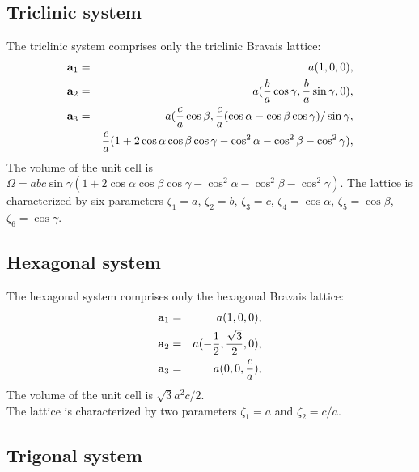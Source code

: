 \documentclass[12pt,a4paper,twoside]{report}
\begin{document}
{\color{web-blue}\subsection{Triclinic system}}
\color{black}

The triclinic system comprises only the triclinic Bravais lattice:
\begin{eqnarray}
{\bf a}_1 &=& a (1, 0, 0), \nonumber \\
{\bf a}_2 &=& a ({b \over a}\cos\gamma, {b \over a}\sin\gamma, 0), \nonumber \\
{\bf a}_3 &=& a ({c \over a} \cos{\beta}, {c \over a}(\cos\alpha-\cos\beta\cos\gamma)/\sin\gamma,\nonumber \\
&\phantom{=}& {c \over a}(1+2\cos\alpha\cos\beta\cos\gamma-\cos^2\alpha-\cos^2\beta-\cos^2\gamma), \nonumber 
\end{eqnarray}
The volume of the unit cell is $\Omega=abc \sin\gamma \left( 
1+2\cos\alpha\cos\beta\cos\gamma-\cos^2\alpha-\cos^2\beta-\cos^2\gamma\right)
$.
The lattice is characterized by six parameters $\zeta_1=a$, 
$\zeta_2=b$, $\zeta_3=c$, $\zeta_4=\cos\alpha$,
$\zeta_5=\cos\beta$, $\zeta_6=\cos\gamma$.

{\color{web-blue}\subsection{Hexagonal system}}
\color{black}

The hexagonal system comprises only the hexagonal Bravais lattice:
\begin{eqnarray}
{\bf a}_1 &=& a (1, 0, 0), \nonumber \\
{\bf a}_2 &=& a (-{1 \over 2}, {\sqrt{3} \over 2}, 0), \nonumber \\
{\bf a}_3 &=& a (0, 0, {c\over a}), \nonumber
\nonumber
\end{eqnarray}
The volume of the unit cell is $\sqrt{3} a^2 c /2$. \\
The lattice is characterized by two parameters $\zeta_1=a$ 
and $\zeta_2=c/a$.

{\color{web-blue}\subsection{Trigonal system}}
\color{black}
\end{document}

